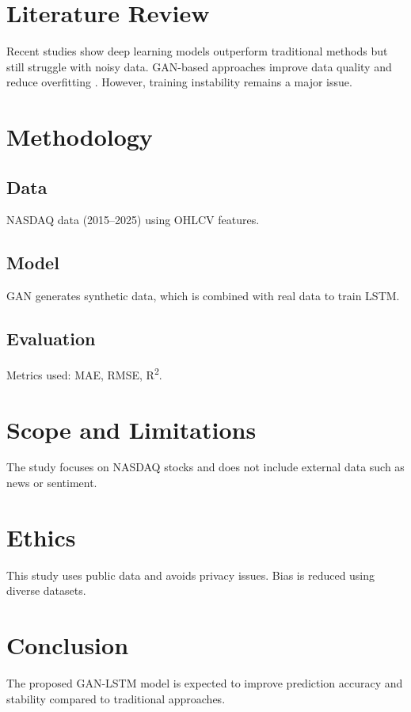 \documentclass[12pt]{article}
\begin{document}
\section{Literature Review}
Recent studies show deep learning models outperform traditional methods but still struggle with noisy data. GAN-based approaches improve data quality and reduce overfitting \cite{kumar2022}. However, training instability remains a major issue.

\section{Methodology}
\subsection{Data}
NASDAQ data (2015–2025) using OHLCV features.

\subsection{Model}
GAN generates synthetic data, which is combined with real data to train LSTM.

\subsection{Evaluation}
Metrics used: MAE, RMSE, R\textsuperscript{2}.

\section{Scope and Limitations}
The study focuses on NASDAQ stocks and does not include external data such as news or sentiment.

\section{Ethics}
This study uses public data and avoids privacy issues. Bias is reduced using diverse datasets.

\section{Conclusion}
The proposed GAN-LSTM model is expected to improve prediction accuracy and stability compared to traditional approaches.



\end{document}
